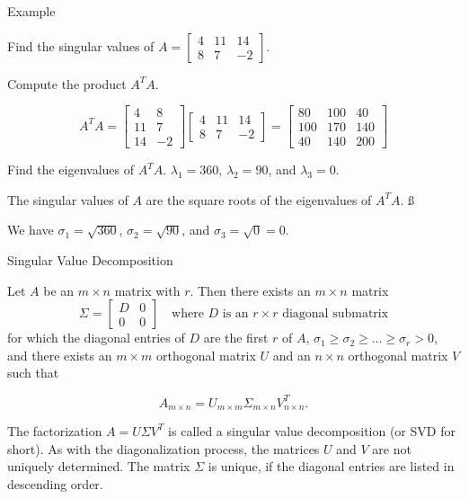 \documentclass[xcolor=dvipsnames,aspectratio=169,t]{beamer}
\begin{document}
\begin{frame}{Example}
  \medskip

  Find the \alert{singular values} of
  $A = \begin{bmatrix} 4 & 11 & 14 \\ 8 & 7 & -2 \end{bmatrix}$.
  \bigskip

  \pause
  \bb
  \ii Compute the product $A^T A$.

  \alert{\[ A^T A = \begin{bmatrix} 4 & 8 \\ 11 & 7 \\ 14 & -2 \end{bmatrix} \begin{bmatrix} 4 & 11 & 14 \\ 8 & 7 & -2 \end{bmatrix} = \begin{bmatrix} 80 & 100 & 40 \\ 100 & 170 & 140 \\ 40 & 140 & 200 \end{bmatrix}\]}

  \ii Find the eigenvalues of $A^T A$. \alert{$\lambda_1 = 360$, $\lambda_2 = 90$, and $\lambda_3 =0$}.
  \medskip

  \ii The singular values of $A$ are the square roots of the eigenvalues of $A^TA$. \ss

  \alert{We have $\sigma_1 = \sqrt{360}$, $\sigma_2 = \sqrt{90}$, and $\sigma_3 = \sqrt{0}=0$.}
  \ee
\end{frame}


\begin{frame}{Singular Value Decomposition}

  \begin{theorem}
  Let $A$ be an $m \times n$ matrix with  $r$.
  Then there exists an $m \times n$ matrix 
  \[ \Sigma = \begin{bmatrix} D & 0 \\ 0 & 0 \end{bmatrix} \quad \mbox{where $D$ is an $r \times r$ diagonal submatrix}\]
  for which the diagonal entries of $D$ are the first $r$  of $A$, $\sigma_1 \geq \sigma_2 \geq \ldots \geq \sigma_r >0$,
  and there exists an $m \times m$ orthogonal matrix $U$ 
  and an $n \times n$ orthogonal matrix $V$ such that
  \vspace*{-.5em}
  
  {\large 
  \[ A_{m\times n} = U_{m\times m} \Sigma_{m \times n} V_{n \times n}^T. \]%
  }
  \vspace*{-1em}
  \end{theorem}

  \bi
  \ii The factorization $A = U \Sigma V^T$ is called a \alert{singular value decomposition} (or \alert{SVD} for short). \smallskip
  \ii As with the diagonalization process, the matrices $U$ and $V$ are \alert{not} uniquely determined. \smallskip
  \ii The matrix $\Sigma$ is unique, if the diagonal entries are listed in descending order.
  \ei
\end{frame}
\end{document}
